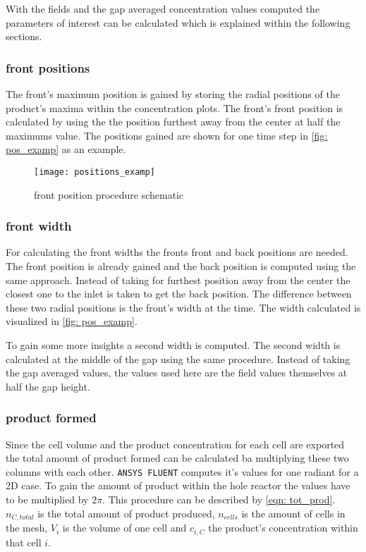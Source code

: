 \documentclass[../thesis.tex]{subfiles}
\begin{document}
With the fields and the gap averaged concentration values computed the parameters of interest can be calculated which is explained within the following sections.

\subsubsection{front positions}

The front's maximum position is gained by storing the radial positions of the product's maxima within the concentration plots. The front's front position is calculated by using the the position furthest away from the center at half the maximums value. The positions gained are shown for one time step in \autoref{fig: pos_examp} as an example.

\begin{figure}[htb]
	\centering
	\texttt{[image: positions\_examp]}
	\caption{front position procedure schematic}
	\label{fig: pos_examp}
\end{figure}

\subsubsection{front width}

For calculating the front widths the fronts front and back positions are needed. The front position is already gained and the back position is computed using the same approach. Instead of taking for furthest position away from the center the closest one to the inlet is taken to get the back position. The difference between these two radial positions is the front's width at the time. The width calculated is visualized in \autoref{fig: pos_examp}.

To gain some more insights a second width is computed. The second width is calculated at the middle of the gap using the same procedure. Instead of taking the gap averaged values, the values used here are the field values themselves at half the gap height.

\subsubsection{product formed}

Since the cell volume and the product concentration for each cell are exported the total amount of product formed can be calculated ba multiplying these two columns with each other. \texttt{ANSYS FLUENT} computes it's values for one radiant for a 2D case. To gain the amount of product within the hole reactor the values have to be multiplied by $2 \pi$. This procedure can be described by \autoref{eqn: tot_prod}. $ n_{C, total} $ is the total amount of product produced, $n_{cells}$ is the amount of cells in the mesh, $ V_i $ is the volume of one cell and $c_{i, C}$ the product's concentration within that cell $i$.
\end{document}
